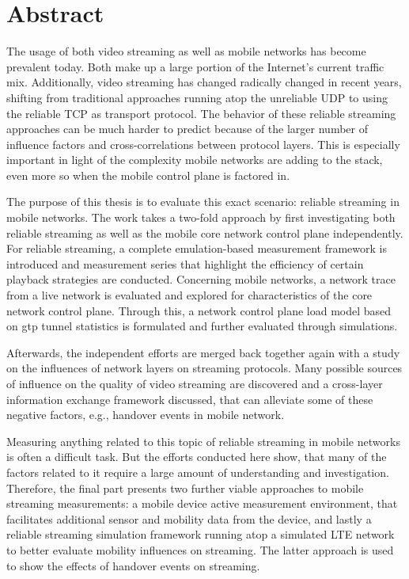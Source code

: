 \chapter*{Abstract}
%

The usage of both video streaming as well as mobile networks has become prevalent today. Both make up a large portion of the Internet's current traffic mix. Additionally, video streaming has changed radically changed in recent years, shifting from traditional approaches running atop the unreliable \acrshort{UDP} to using the reliable \acrshort{TCP} as transport protocol. The behavior of these reliable streaming approaches can be much harder to predict because of the larger number of influence factors and cross-correlations between protocol layers. This is especially important in light of the complexity mobile networks are adding to the stack, even more so when the mobile control plane is factored in.

The purpose of this thesis is to evaluate this exact scenario: reliable streaming in mobile networks. The work takes a two-fold approach by first investigating both reliable streaming as well as the mobile core network control plane independently. For reliable streaming, a complete emulation-based measurement framework is introduced and measurement series that highlight the efficiency of certain playback strategies are conducted. Concerning mobile networks, a network trace from a live network is evaluated and explored for characteristics of the core network control plane. Through this, a network control plane load model based on \acrshort{gtp} tunnel statistics is formulated and further evaluated through simulations.

Afterwards, the independent efforts are merged back together again with a study on the influences of network layers on streaming protocols. Many possible sources of influence on the quality of video streaming are discovered and a cross-layer information exchange framework discussed, that can alleviate some of these negative factors, e.g., handover events in mobile network. 

Measuring anything related to this topic of reliable streaming in mobile networks is often a difficult task. But the efforts conducted here show, that many of the factors related to it require a large amount of understanding and investigation. Therefore, the final part presents two further viable approaches to mobile streaming measurements: a mobile device active measurement environment, that facilitates additional sensor and mobility data from the device, and lastly a reliable streaming simulation framework running atop a simulated \acrshort{LTE} network to better evaluate mobility influences on streaming. The latter approach is used to show the effects of handover events on streaming. 

